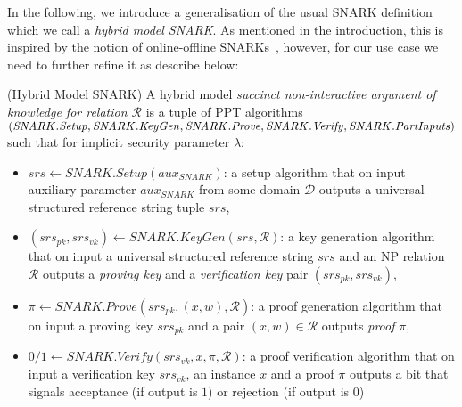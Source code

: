 \noindent In the following, we introduce a generalisation of the usual SNARK definition which we call a \emph{hybrid model SNARK}. 
As mentioned in the introduction, this is inspired by the notion of online-offline SNARKs~\cite{HP_paper}, however, for 
our use case we need to further refine it as describe below:                                      
\begin{dfn}(Hybrid Model SNARK)
\label{dfn_snark}
A hybrid model \emph{succinct non-interactive argument of knowledge for relation $\mathcal{R}$} is a tuple of PPT algorithms 
$(\mathit{SNARK.Setup}, \mathit{SNARK.KeyGen}, \mathit{SNARK.Prove}, \\ \mathit{SNARK.Verify}, \mathit{SNARK.PartInputs})$ 
such that for implicit security parameter $\lambda$: 

\begin{itemize}
\item $\mathit{srs} \leftarrow \mathit{SNARK.Setup} (\mathit{aux_{\mathit{SNARK}}})$: a setup algorithm that on input auxiliary parameter 
$\mathit{aux_{\mathit{SNARK}}}$ from some domain $\mathcal{D}$ outputs a universal structured reference string tuple $\mathit{srs}$, 

\item $(\mathit{srs_{pk}}, \mathit{srs_{vk}}) \leftarrow \mathit{SNARK.KeyGen}(\mathit{srs}, \mathcal{R})$: a key generation algorithm that on input a
universal structured reference string $\mathit{srs}$ and an NP relation $\mathcal{R}$ outputs a \emph{proving key} and 
a \emph{verification key} pair $(\mathit{srs_{pk}}, \mathit{srs_{vk}})$,

\item $\pi \leftarrow \mathit{SNARK.Prove}(\mathit{srs_{pk}}, (x,w), \mathcal{R})$: a proof generation algorithm that on input a proving key 
$\mathit{srs_{pk}}$ and a pair $(x,w) \in \mathcal{R}$ outputs \emph{proof} $\pi$, 

\item $0/1 \leftarrow \mathit{SNARK.Verify}(\mathit{srs_{vk}}, x, \pi, \mathcal{R})$: a proof verification algorithm that on input a verification key 
$\mathit{srs_{vk}}$, an instance $x$ and a proof $\pi$ outputs a bit that signals acceptance (if output is $1$) or rejection (if output is $0$)


\end{itemize}
\end{dfn}

